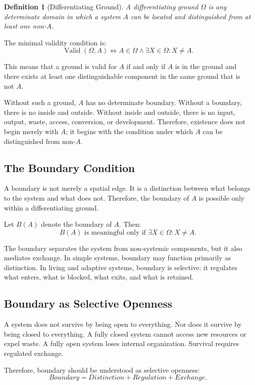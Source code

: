 \documentclass[11pt,a4paper]{article}
\newtheorem{definition}{Definition}
\newcommand{\Valid}{\operatorname{Valid}}
\begin{document}
\begin{definition}[Differentiating Ground]
A differentiating ground $\Omega$ is any determinate domain in which a system $A$ can be located and distinguished from at least one non-$A$.
\end{definition}

The minimal validity condition is:
\[
\Valid(\Omega,A)
\Longleftrightarrow
A\in\Omega
\wedge
\exists X\in\Omega:X\neq A.
\]

This means that a ground is valid for $A$ if and only if $A$ is in the ground and there exists at least one distinguishable component in the same ground that is not $A$.

Without such a ground, $A$ has no determinate boundary. Without a boundary, there is no inside and outside. Without inside and outside, there is no input, output, waste, access, conversion, or development. Therefore, existence does not begin merely with $A$; it begins with the condition under which $A$ can be distinguished from non-$A$.

\subsection{The Boundary Condition}

A boundary is not merely a spatial edge. It is a distinction between what belongs to the system and what does not. Therefore, the boundary of $A$ is possible only within a differentiating ground.

Let $B(A)$ denote the boundary of $A$. Then:
\[
B(A)\text{ is meaningful only if }\exists X\in\Omega:X\neq A.
\]

The boundary separates the system from non-systemic components, but it also mediates exchange. In simple systems, boundary may function primarily as distinction. In living and adaptive systems, boundary is selective: it regulates what enters, what is blocked, what exits, and what is retained.

\subsection{Boundary as Selective Openness}

A system does not survive by being open to everything. Nor does it survive by being closed to everything. A fully closed system cannot access new resources or expel waste. A fully open system loses internal organization. Survival requires regulated exchange.

Therefore, boundary should be understood as selective openness:
\[
Boundary = Distinction + Regulation + Exchange.
\]
\end{document}
